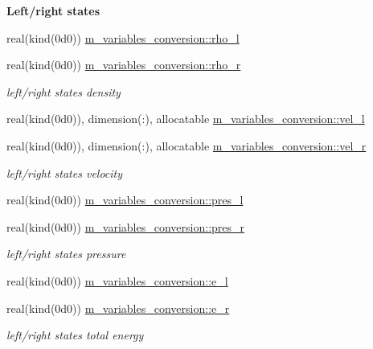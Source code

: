 \begin{Indent}\textbf{ Left/right states}\par
\begin{DoxyCompactItemize}
\item 
real(kind(0d0)) \hyperlink{namespacem__variables__conversion_aa5ce8a8bee676634917c9ab8f5d22c21}{m\+\_\+variables\+\_\+conversion\+::rho\+\_\+l}
\item 
real(kind(0d0)) \hyperlink{namespacem__variables__conversion_a05df52959cedafb938a98a6afd93274c}{m\+\_\+variables\+\_\+conversion\+::rho\+\_\+r}
\begin{DoxyCompactList}\small\item\em left/right states density \end{DoxyCompactList}\item 
real(kind(0d0)), dimension(\+:), allocatable \hyperlink{namespacem__variables__conversion_a9ef76270f02246abad03ce449673de84}{m\+\_\+variables\+\_\+conversion\+::vel\+\_\+l}
\item 
real(kind(0d0)), dimension(\+:), allocatable \hyperlink{namespacem__variables__conversion_a7e09e021d90fc326b8869c854321b9f2}{m\+\_\+variables\+\_\+conversion\+::vel\+\_\+r}
\begin{DoxyCompactList}\small\item\em left/right states velocity \end{DoxyCompactList}\item 
real(kind(0d0)) \hyperlink{namespacem__variables__conversion_a46be9183c95b82af0d7552cd16f487f1}{m\+\_\+variables\+\_\+conversion\+::pres\+\_\+l}
\item 
real(kind(0d0)) \hyperlink{namespacem__variables__conversion_a36ee8d46fb5ce8b870cabc66ec1d62ba}{m\+\_\+variables\+\_\+conversion\+::pres\+\_\+r}
\begin{DoxyCompactList}\small\item\em left/right states pressure \end{DoxyCompactList}\item 
real(kind(0d0)) \hyperlink{namespacem__variables__conversion_a7cd906bb65027a37f6e53ed835f74cfc}{m\+\_\+variables\+\_\+conversion\+::e\+\_\+l}
\item 
real(kind(0d0)) \hyperlink{namespacem__variables__conversion_a679b4b915633d222074a89abcbfe35dc}{m\+\_\+variables\+\_\+conversion\+::e\+\_\+r}
\begin{DoxyCompactList}\small\item\em left/right states total energy \end{DoxyCompactList}\item 

\end{DoxyCompactItemize}
\end{Indent}
